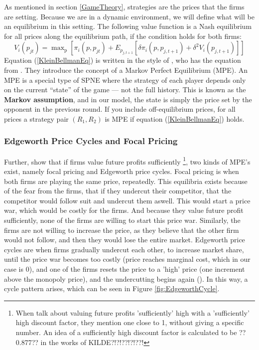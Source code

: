 \documentclass{article}
\begin{document}
As mentioned in section \ref{GameTheory}, strategies are the prices that the firms are setting.
\newline
Because we are in a dynamic environment, we will define what will be an equilibrium in this setting. 
The following value function is a Nash equilibrium for all prices along the equilibrium path, if the condition holds for both firms:
\begin{equation} \label{KleinBellmanEq}
    V_i(p_{jt}) = \mathop{\text{max}}_{\text{p}} [\pi_i (p,p_{jt}) + E_{p_{j,t+1}}[\delta \pi_i (p,p_{j,t+1})+\delta^2 V_i (p_{j,t+1}) ]]
\end{equation}
Equation (\ref{KleinBellmanEq}) is written in the style of \cite{Klein2021}, who has the equation from \cite{MaskinTirole}. They introduce the concept of a Markov Perfect Equilibrium (MPE). An MPE is a special type of SPNE where the strategy of each player depends only on the current “state” of the game — not the full history. This is known as the \textbf{Markov assumption}, and in our model, the state is simply the price set by the opponent in the previous round.
If you include off-equilibrium prices, for all prices a strategy pair $(R_1,R_2)$ is MPE if equation (\ref{KleinBellmanEq}) holds.

\subsubsection{Edgeworth Price Cycles and Focal Pricing} \label{EdgeworthFocalpricingSec}
Further, \cite{MaskinTirole} show that if firms value future profits sufficiently \footnote{When \cite{MaskinTirole} talk about valuing future profits 'sufficiently' high with a 'sufficiently' high discount factor, they mention one close to 1, without giving a specific number. An idea of a sufficiently high discount factor is calculated to be ??0.877?? in the works of KILDE?!?!??!?!??!}, two kinds of MPE's exist, 
namely focal pricing and Edgeworth price cycles.
Focal pricing is when both firms are playing the same price, repeatedly. This equilibria exists because of the fear from the firms, that if they undercut their competitor, that the competitor would follow suit and undercut them aswell. This would start a price war, which would be costly for the firms. And because they value future profit sufficiently, none of the firms are willing to start this price war. Similarly, the firms are not willing to increase the price, as they believe that the other firm would not follow, and then they would lose the entire market.
\newline
Edgeworth price cycles are when firms gradually undercut each other, to increase market share, until the price war becomes too costly (price reaches marginal cost, which in our case is 0), and one of the firms resets the price to a 'high' price (one increment above the monopoly price), and the undercutting begins again (\cite{MaskinTirole}). In this way, a cycle pattern arises, which can be seen in Figure \ref{fig:EdgeworthCycle}.
\end{document}
